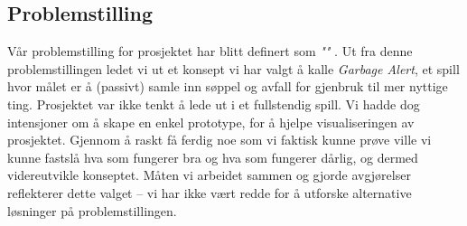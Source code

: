 \subsection{Problemstilling} Vår problemstilling for prosjektet har
blitt definert som \emph{""} . Ut fra denne
problemstillingen ledet vi ut et konsept vi har valgt å kalle
\emph{Garbage Alert}, et spill hvor målet er å (passivt) samle inn
søppel og avfall for gjenbruk til mer nyttige ting. Prosjektet var ikke
tenkt å lede ut i et fullstendig spill. Vi hadde dog intensjoner om å
skape en enkel prototype, for å hjelpe visualiseringen av prosjektet.
Gjennom å raskt få ferdig noe som vi faktisk kunne prøve ville vi kunne
fastslå hva som fungerer bra og hva som fungerer dårlig, og dermed
videreutvikle konseptet. Måten vi arbeidet sammen og gjorde avgjørelser
reflekterer dette valget – vi har ikke vært redde for å utforske
alternative løsninger på problemstillingen.

